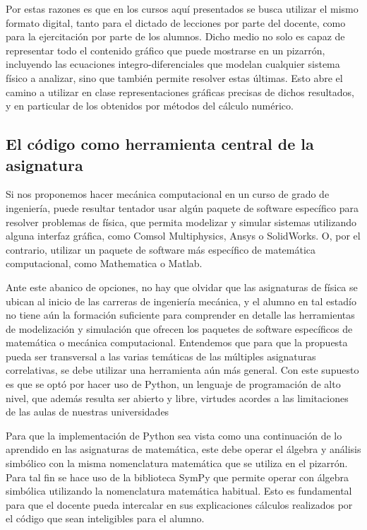 \documentclass[a4paper]{fodami}        %
\begin{document}
Por estas razones es que en los cursos aquí presentados se busca utilizar el mismo formato digital, tanto para el dictado de lecciones por parte del docente, como para la ejercitación por parte de los alumnos.
Dicho medio no solo es capaz de representar todo el contenido gráfico que puede mostrarse en un pizarrón, incluyendo las ecuaciones integro-diferenciales que modelan cualquier sistema físico a analizar, sino que también permite resolver estas últimas.
Esto abre el camino a utilizar en clase representaciones gráficas precisas de dichos resultados, y en particular de los obtenidos por métodos del cálculo numérico.



\subsection{El código como herramienta central de la asignatura}

Si nos proponemos hacer mecánica computacional en un curso de grado de ingeniería, puede resultar tentador usar algún paquete de software específico para resolver problemas de física, que permita modelizar y simular sistemas utilizando alguna interfaz gráfica, como Comsol Multiphysics, Ansys o SolidWorks.
O, por el contrario, utilizar un paquete de software más específico de matemática computacional, como Mathematica o Matlab.

Ante este abanico de opciones, no hay que olvidar que las asignaturas de física se ubican al inicio de las carreras de ingeniería mecánica, y el alumno en tal estadío no tiene aún la formación suficiente para comprender en detalle las herramientas de modelización y simulación que ofrecen los paquetes de software específicos de matemática o mecánica computacional.
Entendemos que para que la propuesta pueda ser transversal a las varias temáticas de las múltiples asignaturas correlativas, se debe utilizar una herramienta aún más general. 
Con este supuesto es que se optó por hacer uso de Python, un lenguaje de programación de alto nivel, que además resulta ser abierto y libre, virtudes acordes a las limitaciones de las aulas de nuestras universidades

Para que la implementación de Python sea vista como una continuación de lo aprendido en las asignaturas de matemática, este debe operar el álgebra y análisis simbólico con la misma nomenclatura matemática que se utiliza en el pizarrón.
Para tal fin se hace uso de la biblioteca SymPy \cite{sympy} que permite operar con álgebra simbólica utilizando la nomenclatura matemática habitual.
Esto es fundamental para que el docente pueda intercalar en sus explicaciones cálculos realizados por el código que sean inteligibles para el alumno.
\end{document}
